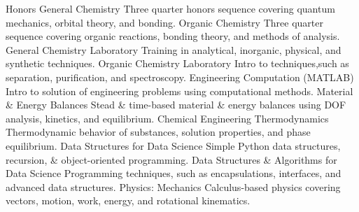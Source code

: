 \begin{cvskills}

  \cvskill
    {Honors General Chemistry} %
    {Three quarter honors sequence covering quantum mechanics, orbital theory, and bonding.} %
\cvskill
    {Organic Chemistry} %
    {Three quarter sequence covering organic reactions, bonding theory, and methods of analysis.} %
\cvskill
    {General Chemistry Laboratory} %
    {Training in analytical, inorganic, physical, and synthetic techniques.} %
\cvskill
    {Organic Chemistry Laboratory} %
    {Intro to techniques,such as separation, purification, and spectroscopy.} %
\cvskill
    {Engineering Computation (MATLAB)} %
    {Intro to solution of engineering problems using computational methods.} %
\cvskill
    {Material \& Energy Balances} %
    {Stead \& time-based material \& energy balances using DOF analysis, kinetics, and equilibrium.} %
\cvskill
    {Chemical Engineering Thermodynamics} %
    {Thermodynamic behavior of substances, solution properties, and phase equilibrium.} %
\cvskill
    {Data Structures for Data Science} %
    {Simple Python data structures, recursion, \& object-oriented programming.} %
\cvskill
    {Data Structures \& Algorithms for Data Science} %
    {Programming techniques, such as encapsulations, interfaces, and advanced data structures.} %
\cvskill
    {Physics: Mechanics} %
    {Calculus-based physics covering vectors, motion, work, energy, and rotational kinematics.} %

\end{cvskills}

